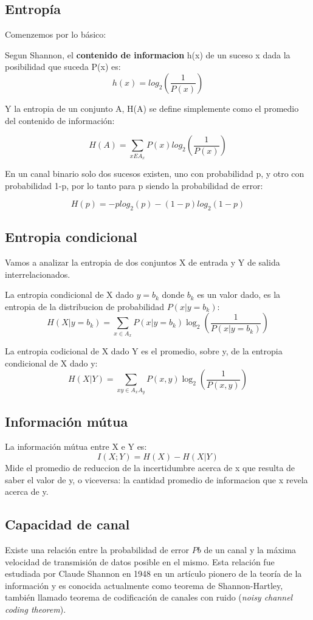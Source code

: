\subsection{Entropía}

Comenzemos por lo básico:

Segun Shannon, el \textbf{contenido de informacion} h(x) de un suceso x dada la posibilidad que suceda P(x) es:
$$ h(x) = log_{2}\left(\frac{1}{P(x)}\right) $$

Y la entropia de un conjunto A, H(A) se define simplemente como el promedio del contenido de información:

$$ H(A) = \sum_{x E A_{x}} P(x)log_{2}\left(\frac{1}{P(x)}\right)$$

En un canal binario solo dos sucesos existen, uno con probabilidad p, y otro con probabilidad 1-p, por lo tanto para p siendo la probabilidad de error:

$$ H(p) = -p log_{2}(p)-(1-p)log_{2}(1-p) $$

\subsection{Entropia condicional}

Vamos a analizar la entropia de dos conjuntos X de entrada y Y de salida interrelacionados.

La entropia condicional de X dado $y=b_k$ donde $b_k$ es un valor dado, es la entropia de la distribucion de probabilidad $P(x|y=b_{k})$:
$$H(X|y=b_{k}) = \sum_{x \in A_{x}} P(x | y=b_{k})\log_2\left(\frac{1}{P(x | y=b_{k})}\right) $$

La entropia codicional de X dado Y es el promedio, sobre y, de la entropia condicional de X dado y:
$$H(X|Y) =  \sum_{xy \in A_{x}A_{y}} P(x,y)\log_2\left(\frac{1}{P(x,y)}\right) $$

\subsection{Información mútua}
La información mútua entre X e Y es:
$$I(X;Y) = H(X)-H(X|Y)$$
Mide el promedio de reduccion de la incertidumbre acerca de x que resulta de saber el valor de y, o viceversa: la cantidad promedio de informacion que x revela acerca de y.

\fi
\subsection{Capacidad de canal}

Existe una relación entre la probabilidad de error $Pb$ de un canal y la máxima velocidad de transmisión de datos posible en el mismo.
Esta relación fue estudiada por Claude Shannon en 1948 en un artículo pionero de la teoría de la información \cite{shannon48} y es conocida actualmente como teorema de Shannon-Hartley, también llamado teorema de codificación de canales con ruido (\textit{noisy channel coding theorem}).

